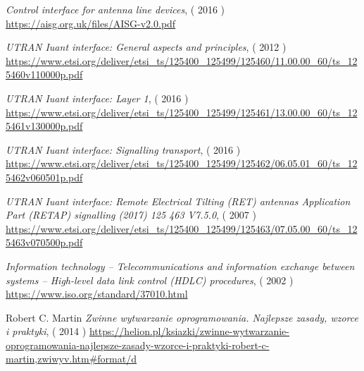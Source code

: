 \cleardoublepage
{}
{}


\begin{thebibliography}{99}
  \emph{Control interface for antenna line devices},
  ( 2016 )
  \newline
  \url{https://aisg.org.uk/files/AISG-v2.0.pdf}

  \emph{UTRAN Iuant interface: General aspects and principles},
  ( 2012 )
  \newline
  \url{https://www.etsi.org/deliver/etsi_ts/125400_125499/125460/11.00.00_60/ts_125460v110000p.pdf}
  
  \emph{UTRAN Iuant interface: Layer 1},
  ( 2016 )
  \newline
  \url{https://www.etsi.org/deliver/etsi_ts/125400_125499/125461/13.00.00_60/ts_125461v130000p.pdf}

  \emph{UTRAN Iuant interface: Signalling transport},
  ( 2016 )
  \newline
  \url{https://www.etsi.org/deliver/etsi_ts/125400_125499/125462/06.05.01_60/ts_125462v060501p.pdf}

  \emph{UTRAN Iuant interface: Remote Electrical Tilting (RET)
antennas Application Part (RETAP) signalling (2017) 125 463 V7.5.0},
  ( 2007 )
  \newline
  \url{https://www.etsi.org/deliver/etsi_ts/125400_125499/125463/07.05.00_60/ts_125463v070500p.pdf}
  
  \emph{Information technology -- Telecommunications and information exchange between systems -- High-level data link control (HDLC) procedures},
  ( 2002 )
  \newline
  \url{https://www.iso.org/standard/37010.html}

  Robert C. Martin
  \newline
  \emph{Zwinne wytwarzanie oprogramowania. Najlepsze zasady, wzorce i praktyki},
  ( 2014 )
  \newline
  \url{https://helion.pl/ksiazki/zwinne-wytwarzanie-oprogramowania-najlepsze-zasady-wzorce-i-praktyki-robert-c-martin,zwiwyv.htm#format/d}
\end{thebibliography}



